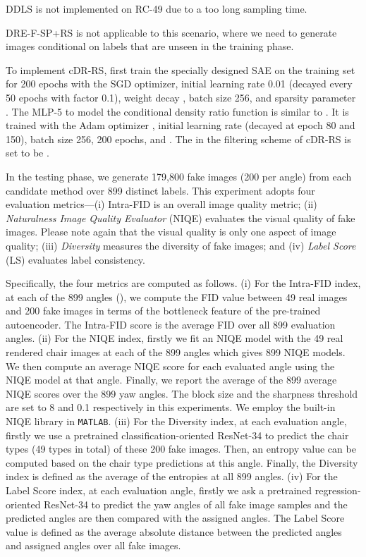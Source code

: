 \documentclass[final,12pt, 3p,times]{elsarticle}
\begin{document}
DDLS is not implemented on RC-49 due to a too long sampling time.

DRE-F-SP+RS is not applicable to this scenario, where we need to generate images conditional on labels that are unseen in the training phase.

To implement cDR-RS, first train the specially designed SAE on the training set for 200 epochs with the SGD optimizer, initial learning rate 0.01 (decayed every 50 epochs with factor 0.1), weight decay , batch size 256, and sparsity parameter . The MLP-5 to model the conditional density ratio function is similar to . It is trained with the Adam optimizer \cite{kingma2014adam}, initial learning rate  (decayed at epoch 80 and 150), batch size 256, 200 epochs, and . The  in the filtering scheme of cDR-RS is set to be . 

In the testing phase, we generate 179,800 fake images (200 per angle) from each candidate method over 899 distinct labels. This experiment adopts four evaluation metrics---(i) Intra-FID \cite{miyato2018cgans} is an overall image quality metric; (ii) \textit{Naturalness Image Quality Evaluator} (NIQE) \cite{mittal2012making} evaluates the visual quality of fake images. Please note again that the visual quality is only one aspect of image quality; (iii) \textit{Diversity} measures the diversity of fake images; and (iv) \textit{Label Score} (LS) evaluates label consistency. 

Specifically, the four metrics are computed as follows. (i) For the Intra-FID index, at each of the 899 angles (), we compute the FID \cite{heusel2017gans} value between 49 real images and 200 fake images in terms of the bottleneck feature of the pre-trained autoencoder. The Intra-FID score is the average FID over all 899 evaluation angles. (ii) For the NIQE index, firstly we fit an NIQE model with the 49 real rendered chair images at each of the 899 angles which gives 899 NIQE models. We then compute an average NIQE score for each evaluated angle using the NIQE model at that angle. Finally, we report the average of the 899 average NIQE scores over the 899 yaw angles. The block size and the sharpness threshold are set to 8 and 0.1 respectively in this experiments. We employ the built-in NIQE library in \texttt{MATLAB}. (iii) For the Diversity index, at each evaluation angle, firstly we use a pretrained classification-oriented ResNet-34 to predict the chair types (49 types in total) of these 200 fake images. Then, an entropy value can be computed based on the chair type predictions at this angle. Finally, the Diversity index is defined as the average of the entropies at all 899 angles. (iv) For the Label Score index, at each evaluation angle, firstly we ask a pretrained regression-oriented ResNet-34 to predict the yaw angles of all fake image samples and the predicted angles are then compared with the assigned angles. The Label Score value is defined as the average absolute distance between the predicted angles and assigned angles over all fake images.
\end{document}
